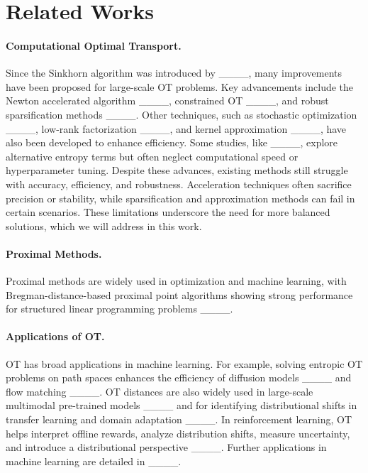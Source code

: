 \section{Related Works}
\paragraph{Computational Optimal Transport.} 
Since the Sinkhorn algorithm was introduced by ____, many improvements have been proposed for large-scale OT problems. Key advancements include the Newton accelerated algorithm ____, constrained OT ____, and robust sparsification methods ____. Other techniques, such as stochastic optimization ____, low-rank factorization ____, and kernel approximation ____, have also been developed to enhance efficiency. Some studies, like ____, explore alternative entropy terms but often neglect computational speed or hyperparameter tuning. Despite these advances, existing methods still struggle with accuracy, efficiency, and robustness. Acceleration techniques often sacrifice precision or stability, while sparsification and approximation methods can fail in certain scenarios. These limitations underscore the need for more balanced solutions, which we will address in this work.

\paragraph{Proximal Methods.} Proximal methods are widely used in optimization and machine learning, with Bregman-distance-based proximal point algorithms showing strong performance for structured linear programming problems ____. 

\paragraph{Applications of OT.}
OT has broad applications in machine learning. For example, solving entropic OT problems on path spaces enhances the efficiency of diffusion models ____ and flow matching ____. OT distances are also widely used in large-scale multimodal pre-trained models ____ and for identifying distributional shifts in transfer learning and domain adaptation ____. In reinforcement learning, OT helps interpret offline rewards, analyze distribution shifts, measure uncertainty, and introduce a distributional perspective ____. Further applications in machine learning are detailed in ____.